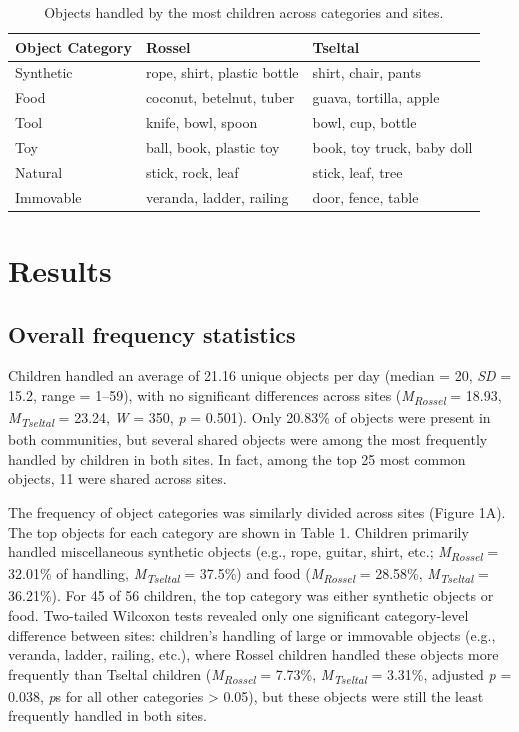 \documentclass[10pt, letterpaper]{article}
\begin{document}
\begin{table}[!ht]
\centering
\begingroup\small
\begin{tabular}{lll}
  \hline
Object Category & Rossel & Tseltal \\ 
  \hline
Synthetic & rope, shirt, plastic bottle & shirt, chair, pants \\ 
  Food & coconut, betelnut, tuber & guava, tortilla, apple \\ 
  Tool & knife, bowl, spoon & bowl, cup, bottle \\ 
  Toy & ball, book, plastic toy & book, toy truck, baby doll \\ 
  Natural & stick, rock, leaf & stick, leaf, tree \\ 
  Immovable & veranda, ladder, railing & door, fence, table \\ 
   \hline
\end{tabular}
\endgroup
\caption{Objects handled by the most children across categories and sites.} 
\end{table}

\hypertarget{results}{%
\section{Results}\label{results}}

\hypertarget{overall-frequency-statistics}{%
\subsection{Overall frequency
statistics}\label{overall-frequency-statistics}}

Children handled an average of 21.16 unique objects per day (median =
20, \emph{SD} = 15.2, range = 1--59), with no significant differences
across sites (\emph{M}\textsubscript{\emph{Rossel}} = 18.93,
\emph{M}\textsubscript{\emph{Tseltal}} = 23.24, \emph{W} = 350, \emph{p}
= 0.501). Only 20.83\% of objects were present in both communities, but
several shared objects were among the most frequently handled by
children in both sites. In fact, among the top 25 most common objects,
11 were shared across sites.

The frequency of object categories was similarly divided across sites
(Figure 1A). The top objects for each category are shown in Table 1.
Children primarily handled miscellaneous synthetic objects (e.g., rope,
guitar, shirt, etc.; \emph{M}\textsubscript{\emph{Rossel}} = 32.01\% of
handling, \emph{M}\textsubscript{\emph{Tseltal}} = 37.5\%) and food
(\emph{M}\textsubscript{\emph{Rossel}} = 28.58\%,
\emph{M}\textsubscript{\emph{Tseltal}} = 36.21\%). For 45 of 56
children, the top category was either synthetic objects or food.
Two-tailed Wilcoxon tests revealed only one significant category-level
difference between sites: children's handling of large or immovable
objects (e.g., veranda, ladder, railing, etc.), where Rossel children
handled these objects more frequently than Tseltal children
(\emph{M}\textsubscript{\emph{Rossel}} = 7.73\%,
\emph{M}\textsubscript{\emph{Tseltal}} = 3.31\%, adjusted \emph{p} =
0.038, \emph{p}s for all other categories \textgreater{} 0.05), but
these objects were still the least frequently handled in both sites.
\end{document}
